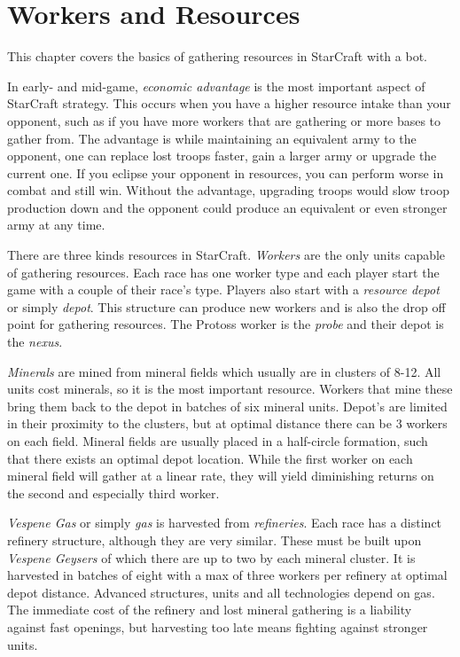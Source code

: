 \chapter{Workers and Resources}
\label{ch:resources}

This chapter covers the basics of gathering resources in StarCraft with a bot. 

In early- and mid-game, \emph{economic advantage} is the most important aspect of StarCraft strategy. This occurs when you have a higher resource intake than your opponent, such as if you have more workers that are gathering or more bases to gather from. The advantage is while maintaining an equivalent army to the opponent, one can replace lost troops faster, gain a larger army or upgrade the current one. If you eclipse your opponent in resources, you can perform worse in combat and still win. Without the advantage, upgrading troops would slow troop production down and the opponent could produce an equivalent or even stronger army at any time.

There are three kinds resources in StarCraft. \emph{Workers} are the only units capable of gathering resources. Each race has one worker type and each player start the game with a couple of their race's type. Players also start with a \emph{resource depot} or simply \emph{depot}. This structure can produce new workers and is also the drop off point for gathering resources. The Protoss worker is the \emph{probe} and their depot is the \emph{nexus}.

\emph{Minerals} are mined from mineral fields which usually are in clusters of 8-12. All units cost minerals, so it is the most important resource. Workers that mine these bring them back to the depot in batches of six mineral units. Depot's are limited in their proximity to the clusters, but at optimal distance there can be 3 workers on each field. Mineral fields are usually placed in a half-circle formation, such that there exists an optimal depot location. While the first worker on each mineral field will gather at a linear rate, they will yield diminishing returns on the second and especially third worker.

\emph{Vespene Gas} or simply \emph{gas} is harvested from \emph{refineries}. Each race has a distinct refinery structure, although they are very similar. These must be built upon \emph{Vespene Geysers} of which there are up to two by each mineral cluster. It is harvested in batches of eight with a max of three workers per refinery at optimal depot distance. Advanced structures, units and all technologies depend on gas. The immediate cost of the refinery and lost mineral gathering is a liability against fast openings, but harvesting too late means fighting against stronger units.

